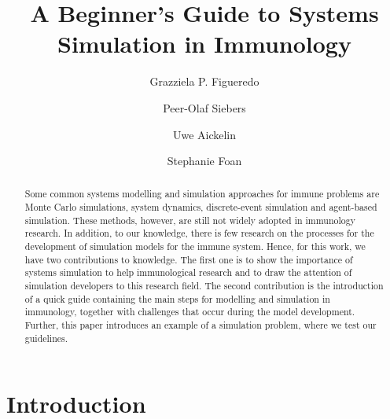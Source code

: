 \documentclass{llncs}
\begin{document}
\mainmatter              

\title{A Beginner's Guide to Systems Simulation in Immunology}


\author{Grazziela P. Figueredo \and Peer-Olaf Siebers  \and Uwe Aickelin \and Stephanie Foan}

   





\maketitle

\begin{abstract}
\noindent

Some common systems modelling and simulation approaches for immune problems are Monte Carlo simulations, system dynamics, discrete-event simulation and agent-based simulation. These methods, however, are still not widely adopted in immunology research. In addition, to our knowledge, there is few research on the processes for the development of simulation models for the immune system. Hence, for this work, we have two contributions to knowledge. The first one is to show the importance of systems simulation to help immunological research and to draw the attention of simulation developers to this research field. The second contribution is the introduction of a quick guide containing the main steps for modelling and simulation in immunology, together with challenges that occur during the model development. Further, this paper introduces an example of a simulation problem, where we test our guidelines.

\end{abstract}

\section{Introduction}
\label{Introduction}
\end{document}
